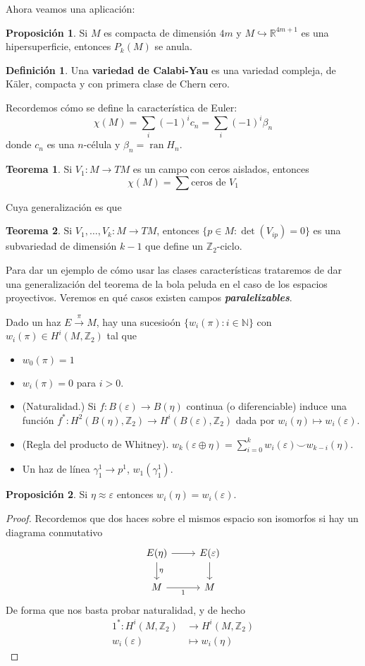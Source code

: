 \documentclass[spanish]{book}
\theoremstyle{definition}
\newtheorem*{defn}{Definición}
\newtheorem*{teo}{Teorema}
\newtheorem*{prop}{Proposición}
\newcommand{\R}{\mathbb{R}}
\newcommand{\Z}{\mathbb{Z}}
\newcommand{\N}{\mathbb{N}}
\begin{document}
Ahora veamos una aplicación:
\begin{prop}
	Si $M$ es compacta de dimensión $4m$ y $M\hookrightarrow \R^{4m+1}$ es una hipersuperficie, entonces $P_k(M)$ se anula.
\end{prop}

\begin{defn}
	Una \textbf{variedad de Calabi-Yau} es una variedad compleja, de Käler, compacta y con primera clase de Chern cero.
\end{defn}
Recordemos cómo se define la característica de Euler:
\[\chi(M)=\sum_i(-1)^ic_n=\sum_i(-1)^i\beta_n\]
donde $c_n$ es una $n$-célula y $\beta_n=\operatorname{ran}H_n$.

\begin{teo}
	Si $V_1:M\to TM$ es un campo con ceros aislados, entonces
	\[\chi(M)=\sum\text{ceros de }V_1\]
\end{teo}
Cuya generalización es que
\begin{teo}
	Si $V_1,\ldots,V_k:M\to TM$, entonces $\{p\in M:\det(V_{ip})=0\}$ es una subvariedad de dimensión $k-1$ que define un $\Z_2$-ciclo.
\end{teo}
Para dar un ejemplo de cómo usar las clases características trataremos de dar una generalización del teorema de la bola peluda en el caso de los espacios proyectivos. Veremos en qué casos existen campos \textbf{\textit{paralelizables}}.

Dado un haz $E\overset{\pi}{\to}M$, hay una sucesioón $\{w_i(\pi):i\in\N\}$ con $w_i(\pi)\in H^i(M,\Z_2)$ tal que
\begin{itemize}
	\item $w_0(\pi)=1$
	\item $w_i(\pi)=0$ para $i>0$.
	\item (Naturalidad.) Si $f:B(\varepsilon)\to B(\eta)$ continua (o diferenciable) induce una función $f^*:H^2(B(\eta),\Z_2)\to H^i(B(\varepsilon),\Z_2)$ dada por $w_i(\eta)\mapsto w_i(\varepsilon)$.
	\item (Regla del producto de Whitney). $w_k(\varepsilon\oplus\eta)=\sum_{i=0}^kw_i(\varepsilon)\smile w_{k-i}(\eta)$.
	\item Un haz de línea $\gamma_1^1\to p^1$, $w_1(\gamma^1_1)$.
\end{itemize}
\begin{prop}
	Si $\eta\approx\varepsilon$ entonces $w_i(\eta)=w_i(\varepsilon)$.
\end{prop}
\begin{proof}
	Recordemos que dos haces sobre el mismos espacio son isomorfos si hay un diagrama conmutativo
	\[\begin{tikzcd}
		E(\eta)\arrow[r]\arrow[d,"\eta"]&E(\varepsilon)\arrow[d]\\
		M\arrow[r,swap,"1"]&M
	\end{tikzcd}\]
	De forma que nos basta probar naturalidad, y de hecho
	\begin{align*}
		1^*:H^i(M,\Z_2)&\to H^i(M,\Z_2)\\
		w_i(\varepsilon)&\mapsto w_i(\eta)
	\end{align*}
\end{proof}
\end{document}
